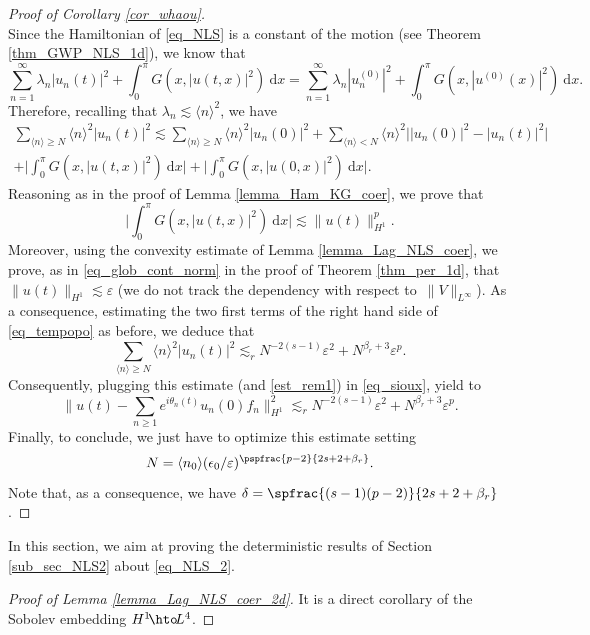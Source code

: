 \begin{proof}[Proof of Corollary \ref{cor_whaou}]
\[\]
Since the Hamiltonian of \ref{eq_NLS} is a constant of the motion (see Theorem \ref{thm_GWP_NLS_1d}), we know that
\[
\sum_{n=1}^\infty \lambda_n |u_n(t)|^2 + \int_0^\pi G(x,|u(t,x)|^2) \ \mathrm{d}x = \sum_{n=1}^\infty \lambda_n |u_n^{(0)}|^2 + \int_0^\pi G(x,|u^{(0)}(x)|^2) \ \mathrm{d}x.
\]
Therefore, recalling that $\lambda_n \lesssim \langle n \rangle^2$, we have
\begin{multline}
\label{eq_tempopo}
\sum_{\langle n \rangle \geq N} \langle n \rangle^2 |u_n(t)|^2 \lesssim \sum_{\langle n \rangle \geq N} \langle n \rangle^2 |u_n(0)|^2 + \sum_{\langle n \rangle < N } \langle n \rangle^2 \bigl||u_n(0)|^2 - |u_n(t)|^2 \bigl| \\
+ \biggl| \int_0^\pi G(x,|u(t,x)|^2) \ \mathrm{d}x \biggr| + \biggl| \int_0^\pi G(x,|u(0,x)|^2) \ \mathrm{d}x \biggr|.
\end{multline}
Reasoning as in the proof of Lemma \ref{lemma_Ham_KG_coer}, we prove that
\[
\biggl| \int_0^\pi G(x,|u(t,x)|^2) \ \mathrm{d}x \biggl| \lesssim \| u(t) \|_{H^1}^p.
\]
Moreover, using the convexity estimate of Lemma \ref{lemma_Lag_NLS_coer}, we prove, as in \eqref{eq_glob_cont_norm} in the proof of Theorem \ref{thm_per_1d}, that $\|u(t)\|_{H^1}\lesssim \varepsilon$ (we do not track the dependency with respect to~$\|V\|_{L^\infty}$). As a consequence, estimating the two first terms of the right hand side of \eqref{eq_tempopo} as before, we deduce that
\[
\sum_{\langle n \rangle \geq N} \langle n \rangle^2 |u_n(t)|^2 \lesssim_r N^{-2(s-1)} \varepsilon^2 + N^{\beta_r+3} \varepsilon^p.
\]
Consequently, plugging this estimate (and \eqref{est_rem1}) in \eqref{eq_sioux}, yield to
\[
\biggl\| u(t) - \sum_{n\geq 1} e^{i\theta_n(t)} u_n(0) f_n \biggr\|_{H^1}^2 \lesssim_r N^{-2(s-1)} \varepsilon^2 + N^{\beta_r+3} \varepsilon^p.
\]
Finally, to conclude, we just have to optimize this estimate setting
\[
N =\langle n_0\rangle (\epsilon_0/\varepsilon)^{\pspfrac{p-2}{2s+2+\beta_r}}.
\]
Note that, as a consequence, we have $\delta = \spfrac{(s-1)(p-2)}{2s+2+\beta_r}$.
\end{proof}

\label{sec_NLS_2d}

In this section, we aim at proving the deterministic results of Section \ref{sub_sec_NLS2} about \eqref{eq_NLS_2}.

\begin{proof}[Proof of Lemma \ref{lemma_Lag_NLS_coer_2d}] It is a direct corollary of the Sobolev embedding $H^1\!\hto\!L^4$.
\end{proof}

